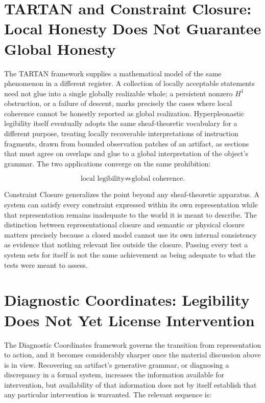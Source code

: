 \documentclass[11pt]{article}
\begin{document}
\section{TARTAN and Constraint Closure: Local Honesty Does Not Guarantee Global Honesty}

The TARTAN framework supplies a mathematical model of the same phenomenon in a different register. A collection of locally acceptable statements need not glue into a single globally realizable whole; a persistent nonzero $H^1$ obstruction, or a failure of descent, marks precisely the cases where local coherence cannot be honestly reported as global realization. Hyperpleonastic legibility itself eventually adopts the same sheaf-theoretic vocabulary for a different purpose, treating locally recoverable interpretations of instruction fragments, drawn from bounded observation patches of an artifact, as sections that must agree on overlaps and glue to a global interpretation of the object's grammar. The two applications converge on the same prohibition:

\[
\boxed{\text{local legibility} \not\Rightarrow \text{global coherence.}}
\]

Constraint Closure generalizes the point beyond any sheaf-theoretic apparatus. A system can satisfy every constraint expressed within its own representation while that representation remains inadequate to the world it is meant to describe. The distinction between representational closure and semantic or physical closure matters precisely because a closed model cannot use its own internal consistency as evidence that nothing relevant lies outside the closure. Passing every test a system sets for itself is not the same achievement as being adequate to what the tests were meant to assess.

\section{Diagnostic Coordinates: Legibility Does Not Yet License Intervention}
\label{sec:diagnostic}

The Diagnostic Coordinates framework governs the transition from representation to action, and it becomes considerably sharper once the material discussion above is in view. Recovering an artifact's generative grammar, or diagnosing a discrepancy in a formal system, increases the information available for intervention, but availability of that information does not by itself establish that any particular intervention is warranted. The relevant sequence is:
\end{document}
